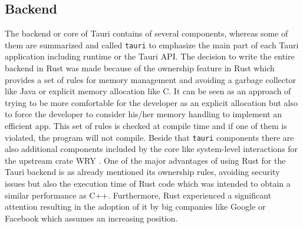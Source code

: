 \subsection{Backend}
\label{subsec:tauri:backend}
The backend or core of Tauri contains of several components, whereas some of them are summarized and called \texttt{tauri} to emphasize the main part of each Tauri application including runtime or the Tauri \ac{API}.
The decision to write the entire backend in Rust was made because of the ownership feature in Rust which provides a set of rules for memory management and avoiding a garbage collector like Java or explicit memory allocation like C.
It can be seen as an approach of trying to be more comfortable for the developer as an explicit allocation but also to force the developer to consider his/her memory handling to implement an efficient app.
This set of rules is checked at compile time and if one of them is violated, the program will not compile.
Beside that \texttt{tauri} components there are also additional components included by the core like system-level interactions for the upstream crate WRY .
One of the major advantages of using Rust for the Tauri backend is as already mentioned its ownership rules, avoiding security issues but also the execution time of Rust code which was intended to obtain a similar performance as C++.
Furthermore, Rust experienced a significant attention resulting in the adoption of it by big companies like Google or Facebook which assumes an increasing position.


